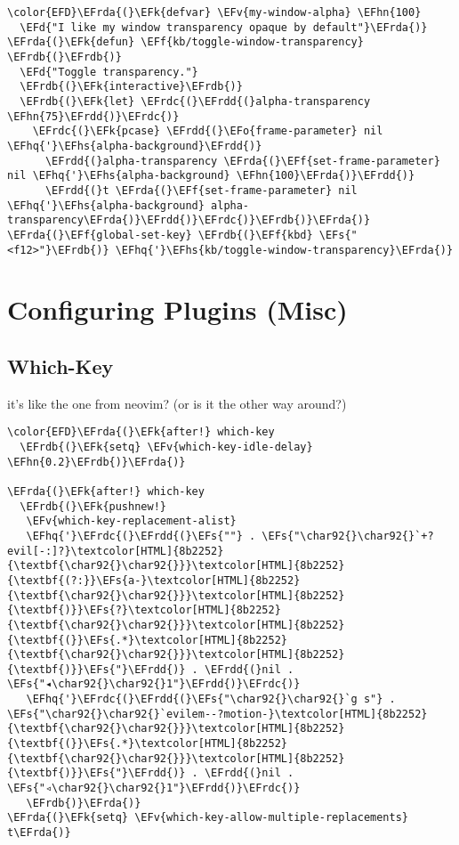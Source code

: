 \documentclass{article}
\newcommand{\EFs}[1]{\textcolor{EFs}{#1}} %
\newcommand{\EFd}[1]{\textcolor{EFd}{#1}} %
\newcommand{\EFk}[1]{\textcolor{EFk}{#1}} %
\newcommand{\EFf}[1]{\textcolor{EFf}{#1}} %
\newcommand{\EFv}[1]{\textcolor{EFv}{#1}} %
\newcommand{\EFo}[1]{\textcolor{EFo}{#1}} %
\newcommand{\EFhn}[1]{\textcolor{EFhn}{\textbf{#1}}} %
\newcommand{\EFhq}[1]{#1} %
\newcommand{\EFhs}[1]{\textcolor{EFhs}{#1}} %
\newcommand{\EFrda}[1]{\textcolor{EFrda}{#1}} %
\newcommand{\EFrdb}[1]{\textcolor{EFrdb}{#1}} %
\newcommand{\EFrdc}[1]{\textcolor{EFrdc}{#1}} %
\newcommand{\EFrdd}[1]{\textcolor{EFrdd}{#1}} %
\begin{document}
\begin{Code}
\begin{Verbatim}
\color{EFD}\EFrda{(}\EFk{defvar} \EFv{my-window-alpha} \EFhn{100}
  \EFd{"I like my window transparency opaque by default"}\EFrda{)}
\EFrda{(}\EFk{defun} \EFf{kb/toggle-window-transparency} \EFrdb{(}\EFrdb{)}
  \EFd{"Toggle transparency."}
  \EFrdb{(}\EFk{interactive}\EFrdb{)}
  \EFrdb{(}\EFk{let} \EFrdc{(}\EFrdd{(}alpha-transparency \EFhn{75}\EFrdd{)}\EFrdc{)}
    \EFrdc{(}\EFk{pcase} \EFrdd{(}\EFo{frame-parameter} nil \EFhq{'}\EFhs{alpha-background}\EFrdd{)}
      \EFrdd{(}alpha-transparency \EFrda{(}\EFf{set-frame-parameter} nil \EFhq{'}\EFhs{alpha-background} \EFhn{100}\EFrda{)}\EFrdd{)}
      \EFrdd{(}t \EFrda{(}\EFf{set-frame-parameter} nil \EFhq{'}\EFhs{alpha-background} alpha-transparency\EFrda{)}\EFrdd{)}\EFrdc{)}\EFrdb{)}\EFrda{)}
\EFrda{(}\EFf{global-set-key} \EFrdb{(}\EFf{kbd} \EFs{"<f12>"}\EFrdb{)} \EFhq{'}\EFhs{kb/toggle-window-transparency}\EFrda{)}
\end{Verbatim}
\end{Code}

\section{Configuring Plugins (Misc)}
\label{sec:org70fb3bb}
\subsection{Which-Key}
\label{sec:orgd9710e7}
it's like the one from neovim? (or is it the other way around?)
\begin{Code}
\begin{Verbatim}
\color{EFD}\EFrda{(}\EFk{after!} which-key
  \EFrdb{(}\EFk{setq} \EFv{which-key-idle-delay} \EFhn{0.2}\EFrdb{)}\EFrda{)}

\EFrda{(}\EFk{after!} which-key
  \EFrdb{(}\EFk{pushnew!}
   \EFv{which-key-replacement-alist}
   \EFhq{'}\EFrdc{(}\EFrdd{(}\EFs{""} . \EFs{"\char92{}\char92{}`+?evil[-:]?}\textcolor[HTML]{8b2252}{\textbf{\char92{}\char92{}}}\textcolor[HTML]{8b2252}{\textbf{(?:}}\EFs{a-}\textcolor[HTML]{8b2252}{\textbf{\char92{}\char92{}}}\textcolor[HTML]{8b2252}{\textbf{)}}\EFs{?}\textcolor[HTML]{8b2252}{\textbf{\char92{}\char92{}}}\textcolor[HTML]{8b2252}{\textbf{(}}\EFs{.*}\textcolor[HTML]{8b2252}{\textbf{\char92{}\char92{}}}\textcolor[HTML]{8b2252}{\textbf{)}}\EFs{"}\EFrdd{)} . \EFrdd{(}nil . \EFs{"◂\char92{}\char92{}1"}\EFrdd{)}\EFrdc{)}
   \EFhq{'}\EFrdc{(}\EFrdd{(}\EFs{"\char92{}\char92{}`g s"} . \EFs{"\char92{}\char92{}`evilem--?motion-}\textcolor[HTML]{8b2252}{\textbf{\char92{}\char92{}}}\textcolor[HTML]{8b2252}{\textbf{(}}\EFs{.*}\textcolor[HTML]{8b2252}{\textbf{\char92{}\char92{}}}\textcolor[HTML]{8b2252}{\textbf{)}}\EFs{"}\EFrdd{)} . \EFrdd{(}nil . \EFs{"◃\char92{}\char92{}1"}\EFrdd{)}\EFrdc{)}
   \EFrdb{)}\EFrda{)}
\EFrda{(}\EFk{setq} \EFv{which-key-allow-multiple-replacements} t\EFrda{)}
\end{Verbatim}
\end{Code}
\end{document}
